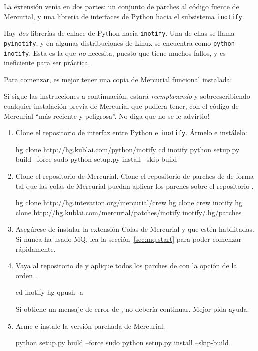 La extensión venía en dos partes: un conjunto de parches al código
fuente de Mercurial, y una librería de interfaces de Python hacia el
subsistema \texttt{inotify}.
\begin{note}
  Hay \emph{dos} librerías de enlace de Python hacia \texttt{inotify}.
  Una de ellas se llama \texttt{pyinotify}, y en algunas
  distribuciones de Linux se encuentra como \texttt{python-inotify}.
  Esta es la que \emph{no} necesita, puesto que tiene muchos fallos,
  y es ineficiente para ser práctica.
\end{note}
Para comenzar, es mejor tener una copia de Mercurial funcional
instalada:
\begin{note}
  Si sigue las instrucciones a continuación, estará
  \emph{reemplazando} y sobreescribiendo cualquier instalación previa
  de Mercurial que pudiera tener, con el código de Mercurial ``más
  reciente y peligrosa''.  No diga que no se le advirtio!
\end{note}
\begin{enumerate}
\item Clone el repositorio de interfaz entre Python e
  \texttt{inotify}. Ármelo e instálelo:
  \begin{codesample4}
    hg clone http://hg.kublai.com/python/inotify
    cd inotify
    python setup.py build --force
    sudo python setup.py install --skip-build
  \end{codesample4}
\item Clone el repositorio  de Mercurial.  Clone el
  repositorio de parches de  de forma tal que las colas
  de Mercurial puedan aplicar los parches sobre el repositorio .
  \begin{codesample4}
    hg clone http://hg.intevation.org/mercurial/crew
    hg clone crew inotify
    hg clone http://hg.kublai.com/mercurial/patches/inotify inotify/.hg/patches
  \end{codesample4}
\item Asegúrese de instalar la extensión Colas de Mercurial
   y que estén habilitadas.  Si nunca ha usado MQ, lea la
  sección~\ref{sec:mq:start} para poder comenzar rápidamente.
\item Vaya al repositorio de  y aplique todos los
  parches de  con la opción  de
  la orden .
  \begin{codesample4}
    cd inotify
    hg qpush -a
  \end{codesample4}
  Si obtiene un mensaje de error de , no debería
  continuar.  Mejor pida ayuda.
\item Arme e instale la versión parchada de Mercurial.
  \begin{codesample4}
    python setup.py build --force
    sudo python setup.py install --skip-build
  \end{codesample4}
\end{enumerate}

